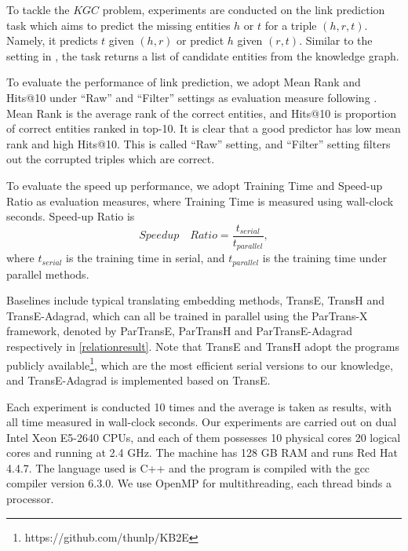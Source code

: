 \documentclass[sigconf]{acmart}
\begin{document}
To tackle the $KGC$ problem, experiments are conducted on the link prediction task
which aims to predict the missing entities $h$ or $t$ for a triple $(h, r, t)$. Namely, it predicts $t$ given $(h, r)$ or predict $h$ given $(r, t)$. Similar to the setting in \cite{bordes2013translating}, the task returns a list of candidate entities from the knowledge graph. 

To evaluate the performance of link prediction, we adopt Mean Rank and Hits@10 under ``Raw'' and ``Filter'' settings as evaluation measure following  \cite{bordes2013translating}. Mean Rank is the average rank of the correct entities, and Hits@10 is proportion of correct entities ranked in top-10. It is clear that a good predictor has low mean rank and high Hits@10.  
This is called ``Raw'' setting, and ``Filter'' setting filters out the corrupted triples which are correct. 

To evaluate the speed up performance, we adopt Training Time and Speed-up Ratio as evaluation measures, where Training Time is measured using wall-clock seconds. Speed-up Ratio is 
\begin{equation}
Speedup \quad Ratio=\frac{t_{serial}}{t_{parallel}},
\end{equation} 
where $t_{serial}$ is the training time in serial, and $t_{parallel}$ is the training time under parallel methods.




Baselines include typical translating embedding methods, TransE, TransH and TransE-Adagrad, which can all be trained in parallel using the ParTrans-X framework, denoted by ParTransE, ParTransH and ParTransE-Adagrad respectively in \tablename \ref{relationresult}.
Note that TransE  and TransH adopt the programs publicly available\footnote{https://github.com/thunlp/KB2E}, which are the most efficient serial versions to our knowledge, and TransE-Adagrad is implemented based on TransE. 




Each experiment is conducted 10 times and the average is taken as results, with all time measured in wall-clock seconds. Our experiments are carried out on dual Intel Xeon E5-2640 CPUs, and each of them possesses 10 physical cores 20 logical cores and running at 2.4 GHz.
The machine has 128 GB RAM and runs Red Hat 4.4.7.
The language used  is C++ and the program is compiled with the gcc compiler version 6.3.0. We use OpenMP for multithreading, each thread binds a processor.
\end{document}
